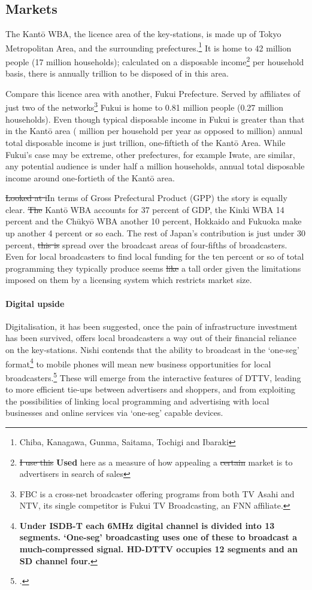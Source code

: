 \documentclass[11pt, oneside, a4paper, headsepline]{scrartcl}
\newcommand{\citej}[2] {\footcite[\nopp #1]{#2} }
\newcommand{\ty}{\textyen}
\begin{document}
\subsection{Markets}
The Kant\={o} WBA, the licence area of the key-stations, is made up of Tokyo Metropolitan Area, and the surrounding prefectures.\footnote{Chiba, Kanagawa, Gunma, Saitama, Tochigi and Ibaraki} It is home to 42 million people (17 million households); calculated on a disposable income\footnote{\st{I use this }\textbf{Used} here as a measure of how appealing a \st{certain} market is to advertisers in search of sales} per household basis, there is annually \ty85.2 trillion to be disposed of in this area.

Compare this licence area with another, Fukui Prefecture. Served by affiliates of just two of the networks\footnote{FBC is a cross-net broadcaster offering programs from both TV Asahi and NTV, its single competitor is Fukui TV Broadcasting, an FNN affiliate.} Fukui is home to 0.81 million people (0.27 million households). Even though typical disposable income in Fukui is greater than that in the Kant\={o} area (\ty6.45 million per household per year as opposed to \ty5.10 million) annual total disposable income is just \ty1.72 trillion, one-fiftieth of the Kant\={o} Area. While Fukui's case may be extreme, other prefectures, for example Iwate, are similar, any potential audience is under half a million households, annual total disposable income around one-fortieth of the Kant\={o} area. 

\st{Looked at i}In terms of Gross Prefectural Product (GPP) the story is equally clear. \st{The} Kant\={o} WBA accounts for 37 percent of GDP, the Kinki WBA 14 percent and the Ch\={u}ky\={o} WBA another 10 percent, Hokkaido and Fukuoka make up another 4 percent or so each. The rest of Japan's contribution is just under 30 percent, \st{this is }spread over the broadcast areas of four-fifths of broadcasters. Even for local broadcasters to find local funding for the ten percent or so of total programming they typically produce seems\st{ like} a tall order given the limitations imposed on them by a licensing system which restricts market size.

\paragraph{Digital upside} Digitalisation, it has been suggested, once the pain of infrastructure investment has been survived, offers local broadcasters a way out of their financial reliance on the key-stations. Nishi contends that the ability to broadcast in the `one-seg' format\footnote{\bf Under ISDB-T each 6MHz digital channel is divided into 13 segments. `One-seg' broadcasting uses one of these to broadcast a much-compressed signal. HD-DTTV occupies 12 segments and an SD channel four.} to mobile phones will mean new business opportunities for local broadcasters.\citej{106}{Nishi:2007} These will emerge from the interactive features of DTTV, leading to more efficient tie-ups between advertisers and shoppers, and from exploiting the possibilities of linking local programming and advertising with local businesses and online services via `one-seg' capable devices. 
\end{document}
